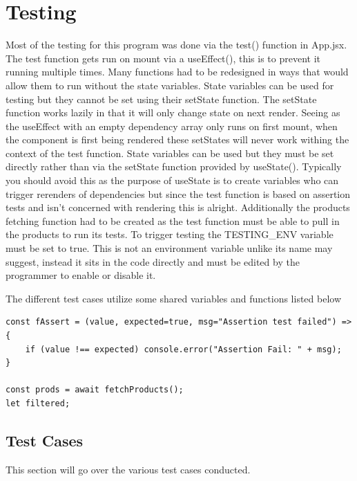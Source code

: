 \documentclass{article}[12pt]
\begin{document}
\section{Testing}
Most of the testing for this program was done via the test() function in App.jsx. The test function gets run on mount via a useEffect(), this is to prevent it running multiple times. Many functions had to be redesigned in ways that would allow them to run without the state variables. State variables can be used for testing but they cannot be set using their setState function. The setState function works lazily in that it will only change state on next render. Seeing as the useEffect with an empty dependency array only runs on first mount, when the component is first being rendered these setStates will never work withing the context of the test function. State variables can be used but they must be set directly rather than via the setState function provided by useState(). Typically you should avoid this as the purpose of useState is to create variables who can trigger rerenders of dependencies but since the test function is based on assertion tests and isn't concerned with rendering this is alright. Additionally the products fetching function had to be created as the test function must be able to pull in the products to run its tests. To trigger testing the TESTING\_ENV variable must be set to true. This is not an environment variable unlike its name may suggest, instead it sits in the code directly and must be edited by the programmer to enable or disable it.

The different test cases utilize some shared variables and functions listed below
\begin{lstlisting}[caption=Persistent variables of test()]
const fAssert = (value, expected=true, msg="Assertion test failed") => {
    if (value !== expected) console.error("Assertion Fail: " + msg);
}

const prods = await fetchProducts();
let filtered;
\end{lstlisting}
\subsection{Test Cases}
This section will go over the various test cases conducted.
\end{document}
